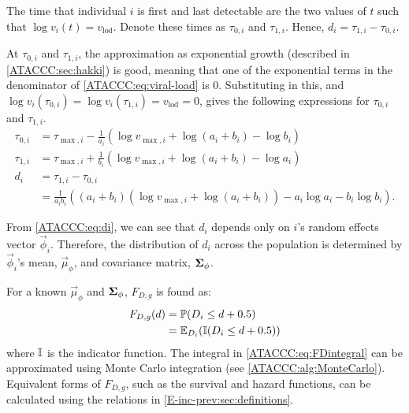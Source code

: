 \documentclass[thesis.tex]{subfiles}
\begin{document}
The time that individual $i$ is first and last detectable are the two values of $t$ such that $\log v_i(t) = v_\text{lod}$.
Denote these times as $\tau_{0,i}$ and $\tau_{1,i}$.
Hence, $d_i = \tau_{1,i} - \tau_{0,i}$.

At $\tau_{0,i}$ and $\tau_{1,i}$, the approximation as exponential growth (described in \cref{ATACCC:sec:hakki}) is good, meaning that one of the exponential terms in the denominator of \cref{ATACCC:eq:viral-load} is 0.
Substituting in this, and $\log v_i(\tau_{0,i}) = \log v_i(\tau_{1,i}) = v_\text{lod} = 0$, gives the following expressions for $\tau_{0,i}$ and $\tau_{1,i}$.
\begin{align}
\tau_{0,i}
&= \tau_{\max,i} - \frac{1}{a_i} \left(\log v_{\max,i} + \log(a_i + b_i) - \log b_i \right) \\
\tau_{1,i}
&= \tau_{\max,i} + \frac{1}{b_i} \left(\log v_{\max,i} + \log(a_i + b_i) - \log a_i \right) \\
d_i
&= \tau_{1,i} - \tau_{0,i}  \\
&= \frac{1}{a_i b_i} \left( (a_i + b_i) (\log v_{\max,i} + \log(a_i + b_i)) - a_i \log a_i - b_i \log b_i \right).
\label{ATACCC:eq:di}
\end{align}

From \cref{ATACCC:eq:di}, we can see that $d_i$ depends only on $i$'s random effects vector $\vec{\phi}_i$.
Therefore, the distribution of $d_i$ across the population is determined by $\vec{\phi}_i$'s mean, $\vec{\mu}_\phi$, and covariance matrix, $\bm{\Sigma}_\phi$.

For a known $\vec{\mu}_\phi$ and $\bm{\Sigma}_\phi$, $F_{D,g}$ is found as:
\begin{align}
  F_{D,g}(d)
  &= \operatorname{\mathbb{P}}(D_i \leq d + 0.5) \\
  &= \operatorname{\mathbb{E}}_{D_i}(\operatorname{\mathbb{I}}(D_i \leq d + 0.5))
  \label{ATACCC:eq:FDintegral}
\end{align}
where $\operatorname{\mathbb{I}}$ is the indicator function.
The integral in \cref{ATACCC:eq:FDintegral} can be approximated using Monte Carlo integration (see \cref{ATACCC:alg:MonteCarlo}).
Equivalent forms of $F_{D,g}$, such as the survival and hazard functions, can be calculated using the relations in \cref{E-inc-prev:sec:definitions}.
\end{document}
